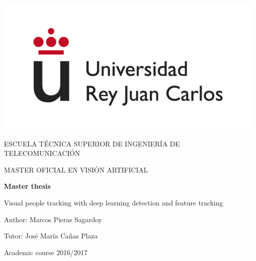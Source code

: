 \begin{titlepage}
	
	\begin{center}
		\vspace*{7.7mm}
		\begin{center}
			\includegraphics[width=0.4\linewidth]{figures/logo.jpg}
		\end{center}
		\vspace{6.5mm}
		
		\fontsize{15.5}{14}\selectfont ESCUELA TÉCNICA SUPERIOR DE INGENIERÍA DE TELECOMUNICACIÓN
		\vspace{13mm}
		
		\fontsize{14}{14}\selectfont MASTER OFICIAL EN VISIÓN ARTIFICIAL 
		
		\vspace{70pt}
		
		\fontsize{15.7}{14}\selectfont \textbf{Master thesis} 
		
		\vspace{25mm}
		\begin{huge}
			Visual people tracking with deep learning detection and feature tracking
		\end{huge}
		
		\vspace{25mm}
		
		\begin{large}
			Author: Marcos Pieras Sagardoy
			
			Tutor: José María Cañas Plaza
						
			\vspace{10mm}
		\end{large}
		\begin{normalsize}
			Academic course 2016/2017		
		\end{normalsize}
		\vspace{10mm}
		
	\end{center}
	
\end{titlepage}

\pagebreak
\thispagestyle{empty}
\vspace*{12cm}

